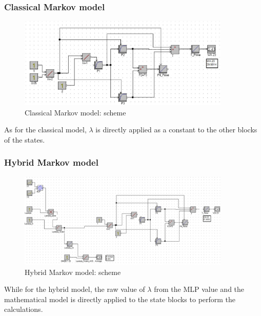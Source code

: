 \documentclass{article}
\begin{document}
\begin{doublespacing}
\subsubsection{Classical Markov model}

\begin{figure}[H] 
    \centering
    \includegraphics[width=0.9\textwidth]{Images/ClassicalModel.JPG} 
    \caption{Classical Markov model: scheme} 
    \label{fig:ClassicalModel} 
\end{figure}

\par As for the classical model, $\lambda$ is directly applied as a constant to the other blocks of the states. 



\subsubsection{Hybrid Markov model}

\begin{figure}[H] 
    \centering
    \includegraphics[width=0.9\textwidth]{Images/HybridModel.JPG} 
    \caption{Hybrid Markov model: scheme} 
    \label{fig:HybridModel} 
\end{figure}

\par While for the hybrid model, the raw value of $\lambda$ from the MLP value and the mathematical model is directly applied to the state blocks to perform the calculations. 







\end{doublespacing}
\end{document}
